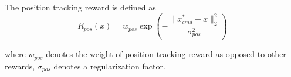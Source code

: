 \documentclass{article}
\begin{document}
The position tracking reward is defined as
\begin{equation}
    R_{pos}(x) = w_{pos} \exp{(-\frac{\|x_{cmd}^* - x\|_2^2}{\sigma_{pos}^2})}
\end{equation}

where $w_{pos}$ denotes the weight of position tracking reward as opposed to other rewards, $\sigma_{pos}$ denotes a regularization factor.







\end{document}
